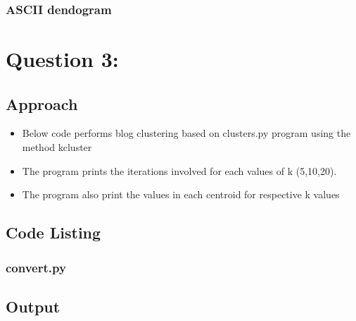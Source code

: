 \documentclass[12pt]{article}
\begin{document}
\subsubsection{ASCII dendogram}

\newpage



\section{Question 3: }
\subsection{Approach}
\begin{itemize}
\item Below code performs blog clustering based on clusters.py program using the method kcluster
\item The program prints the iterations involved for each values of k (5,10,20).
\item The program also print the values in each centroid for respective k values
\end{itemize}


\subsection{Code Listing}
\subsubsection{convert.py}

\newpage


\subsection{Output}
\end{document}
